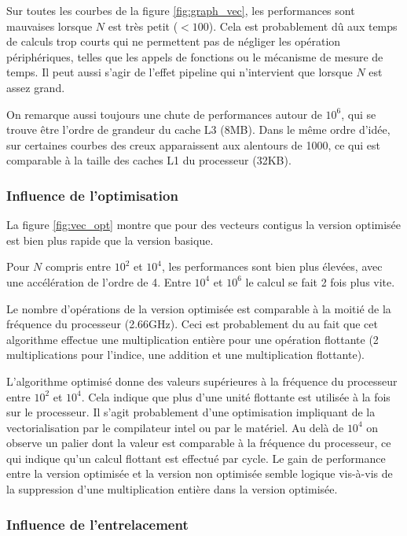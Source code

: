 Sur toutes les courbes de la figure \ref{fig:graph_vec}, les performances sont mauvaises lorsque $N$ est très petit ($<100$). Cela est probablement dû aux temps de calculs trop courts qui ne permettent pas de négliger les opération périphériques, telles que les appels de fonctions ou le mécanisme de mesure de temps. Il peut aussi s'agir de l'effet pipeline qui n'intervient que lorsque $N$ est assez grand.
    
On remarque aussi toujours une chute de performances autour de $10^6$, qui se trouve être l'ordre de grandeur du cache L3 (8MB). Dans le même ordre d'idée, sur certaines courbes des creux apparaissent aux alentours de 1000, ce qui est comparable à la taille des caches L1 du processeur (32KB).

\subsubsection{Influence de l'optimisation}

La figure \ref{fig:vec_opt} montre que pour des vecteurs contigus la version optimisée est bien plus rapide que la version basique.
    
Pour $N$ compris entre $10^2$ et $10^4$, les performances sont bien plus élevées, avec une accélération de l'ordre de 4. Entre $10^4$ et $10^6$ le calcul se fait 2 fois plus vite.
    
Le nombre d'opérations de la version optimisée est comparable à la moitié de la fréquence du processeur (2.66GHz). Ceci est probablement du au fait que cet algorithme effectue une multiplication entière pour une opération flottante (2 multiplications pour l'indice, une addition et une multiplication flottante).
    
L'algorithme optimisé donne des valeurs supérieures à la fréquence du processeur entre $10^2$ et $10^4$. Cela indique que plus d'une unité flottante est utilisée à la fois sur le processeur. Il s'agit probablement d'une optimisation impliquant de la vectorialisation par le compilateur intel ou par le matériel. Au delà de $10^4$ on observe un palier dont la valeur est comparable à la fréquence du processeur, ce qui indique qu'un calcul flottant est effectué par cycle. Le gain de performance entre la version optimisée et la version non optimisée semble logique vis-à-vis de la suppression d'une multiplication entière dans la version optimisée.
    
\subsubsection{Influence de l'entrelacement}

